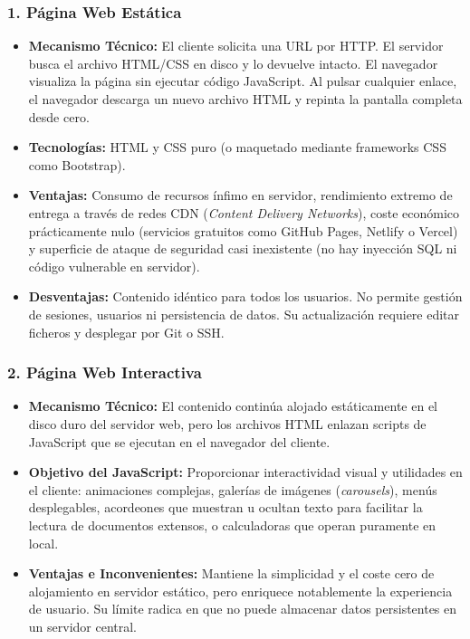 \subsubsection{1. Página Web Estática}
\begin{itemize}[leftmargin=1.2cm]
  \item \textbf{Mecanismo Técnico:} El cliente solicita una URL por HTTP. El servidor busca el archivo HTML/CSS en disco y lo devuelve intacto. El navegador visualiza la página sin ejecutar código JavaScript. Al pulsar cualquier enlace, el navegador descarga un nuevo archivo HTML y repinta la pantalla completa desde cero.
  \item \textbf{Tecnologías:} HTML y CSS puro (o maquetado mediante frameworks CSS como Bootstrap).
  \item \textbf{Ventajas:} Consumo de recursos ínfimo en servidor, rendimiento extremo de entrega a través de redes CDN (\textit{Content Delivery Networks}), coste económico prácticamente nulo (servicios gratuitos como GitHub Pages, Netlify o Vercel) y superficie de ataque de seguridad casi inexistente (no hay inyección SQL ni código vulnerable en servidor).
  \item \textbf{Desventajas:} Contenido idéntico para todos los usuarios. No permite gestión de sesiones, usuarios ni persistencia de datos. Su actualización requiere editar ficheros y desplegar por Git o SSH.
\end{itemize}

\subsubsection{2. Página Web Interactiva}
\begin{itemize}[leftmargin=1.2cm]
  \item \textbf{Mecanismo Técnico:} El contenido continúa alojado estáticamente en el disco duro del servidor web, pero los archivos HTML enlazan scripts de JavaScript que se ejecutan en el navegador del cliente.
  \item \textbf{Objetivo del JavaScript:} Proporcionar interactividad visual y utilidades en el cliente: animaciones complejas, galerías de imágenes (\textit{carousels}), menús desplegables, acordeones que muestran u ocultan texto para facilitar la lectura de documentos extensos, o calculadoras que operan puramente en local.
  \item \textbf{Ventajas e Inconvenientes:} Mantiene la simplicidad y el coste cero de alojamiento en servidor estático, pero enriquece notablemente la experiencia de usuario. Su límite radica en que no puede almacenar datos persistentes en un servidor central.
\end{itemize}


